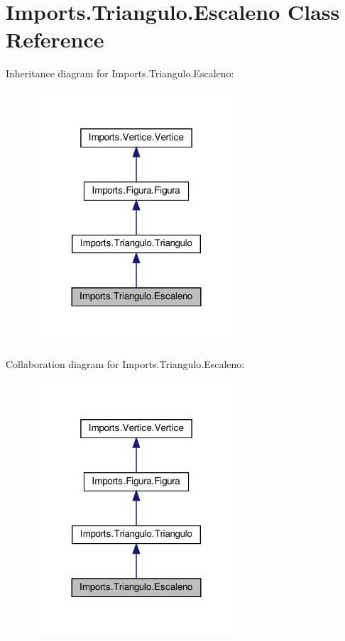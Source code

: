 \hypertarget{class_imports_1_1_triangulo_1_1_escaleno}{}\section{Imports.\+Triangulo.\+Escaleno Class Reference}
\label{class_imports_1_1_triangulo_1_1_escaleno}


Inheritance diagram for Imports.\+Triangulo.\+Escaleno\+:
\nopagebreak
\begin{figure}[H]
\begin{center}
\leavevmode
\includegraphics[width=216pt]{class_imports_1_1_triangulo_1_1_escaleno__inherit__graph}
\end{center}
\end{figure}


Collaboration diagram for Imports.\+Triangulo.\+Escaleno\+:
\nopagebreak
\begin{figure}[H]
\begin{center}
\leavevmode
\includegraphics[width=216pt]{class_imports_1_1_triangulo_1_1_escaleno__coll__graph}
\end{center}
\end{figure}
